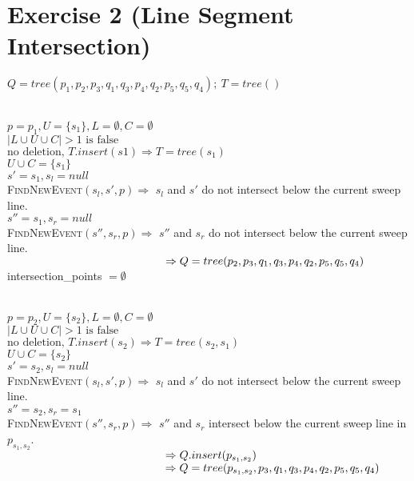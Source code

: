 \documentclass[english, fontsize=12pt, paper=a4, twoside=false, draft=true, pagesize=auto, version=last, DIV=16]{scrartcl}
\theoremstyle{break}
\begin{document}
\section*{Exercise 2 (Line Segment Intersection)}
$Q = tree(p_1,p_2,p_3,q_1,q_3,p_4,q_2,p_5,q_5,q_4); \ T = tree()$ \par
\vspace*{-3mm}
\hrulefill \\
$p = p_1, U = \{s_1\}, L=\emptyset, C=\emptyset$ \\
$|L \cup U \cup C|>1 \text{ is false}$ \\
$\text{no deletion, }T.insert(s1) \Rightarrow T=tree(s_1)$ \\
$U \cup C=\{s_1\}$ \\
$s'=s_1, s_l=null$ \\
{\scshape{FindNewEvent}}$(s_l,s',p) \Rightarrow$ $s_l$ and $s'$ do not intersect below the current sweep line. \\
$s''=s_1, s_r=null$ \\
{\scshape{FindNewEvent}}$(s'',s_r,p) \Rightarrow$ $s''$ and $s_r$ do not intersect below the current sweep line. \\
$\hspace*{49.5mm} \Rightarrow Q=tree(p_2,p_3,q_1,q_3,p_4,q_2,p_5,q_5,q_4)$ \\
intersection\_points $= \emptyset$ \par
\vspace*{-3mm}
\hrulefill \\
$p = p_2, U = \{s_2\}, L=\emptyset, C=\emptyset$ \\
$|L \cup U \cup C|>1 \text{ is false}$ \\
$\text{no deletion, }T.insert(s_2) \Rightarrow T=tree(s_2,s_1)$ \\
$U \cup C=\{s_2\}$ \\
$s'=s_2, s_l=null$ \\
{\scshape{FindNewEvent}}$(s_l,s',p) \Rightarrow$ $s_l$ and $s'$ do not intersect below the current sweep line. \\
$s''=s_2, s_r=s_1$ \\
{\scshape{FindNewEvent}}$(s'',s_r,p) \Rightarrow$ $s''$ and $s_r$ intersect below the current sweep line in $p_{s_1,s_2}$. \\
$\hspace*{49.5mm} \Rightarrow Q.insert(p_{s_1,s_2})$ \\
$\hspace*{49.5mm} \Rightarrow Q=tree(p_{s_1,s_2},p_3,q_1,q_3,p_4,q_2,p_5,q_5,q_4)$ \\
\end{document}
